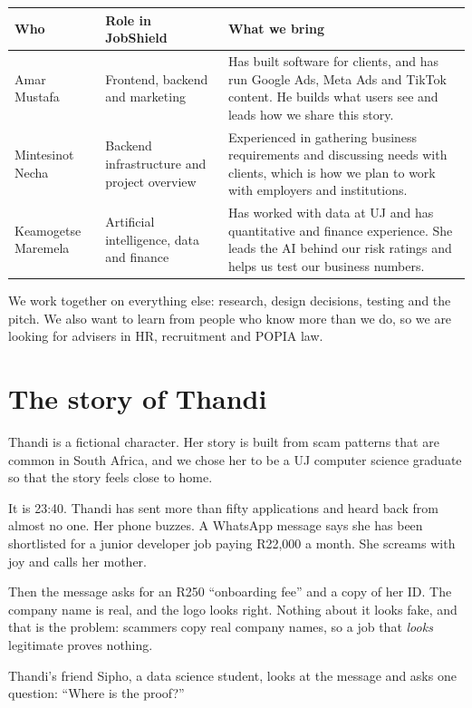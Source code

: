 \documentclass[11pt,a4paper]{article}
\newcommand{\tbl}[1]{\textbf{#1}}
\begin{document}
\begin{center}
\begin{tabularx}{\textwidth}{@{}>{\raggedright\arraybackslash}p{3.3cm}>{\raggedright\arraybackslash}p{3.6cm}>{\raggedright\arraybackslash}X@{}}
\toprule
\tbl{Who} & \tbl{Role in JobShield} & \tbl{What we bring}\\
\midrule
Amar Mustafa & Frontend, backend and marketing & Has built software for clients, and has run Google Ads, Meta Ads and TikTok content. He builds what users see and leads how we share this story.\\
Mintesinot Necha & Backend infrastructure and project overview & Experienced in gathering business requirements and discussing needs with clients, which is how we plan to work with employers and institutions.\\
Keamogetse Maremela & Artificial intelligence, data and finance & Has worked with data at UJ and has quantitative and finance experience. She leads the AI behind our risk ratings and helps us test our business numbers.\\
\bottomrule
\end{tabularx}
\end{center}

We work together on everything else: research, design decisions, testing and the pitch. We also want to learn from people who know more than we do, so we are looking for advisers in HR, recruitment and POPIA law.

\section{The story of Thandi}
Thandi is a fictional character. Her story is built from scam patterns that are common in South Africa, and we chose her to be a UJ computer science graduate so that the story feels close to home.

It is 23:40. Thandi has sent more than fifty applications and heard back from almost no one. Her phone buzzes. A WhatsApp message says she has been shortlisted for a junior developer job paying R22,000 a month. She screams with joy and calls her mother.

Then the message asks for an R250 ``onboarding fee'' and a copy of her ID. The company name is real, and the logo looks right. Nothing about it looks fake, and that is the problem: scammers copy real company names, so a job that \emph{looks} legitimate proves nothing.

Thandi's friend Sipho, a data science student, looks at the message and asks one question: ``Where is the proof?''
\end{document}
